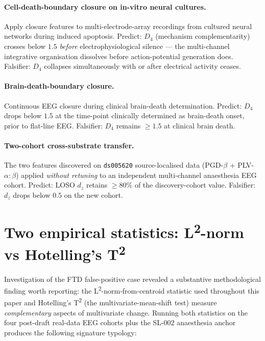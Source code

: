 \documentclass[11pt,a4paper]{article}
\begin{document}
\paragraph{Cell-death-boundary closure on in-vitro neural cultures.}
Apply closure features to multi-electrode-array recordings from cultured neural networks during induced apoptosis. Predict: $D_4$ (mechanism complementarity) crosses below $1.5$ \emph{before} electrophysiological silence --- the multi-channel integrative organisation dissolves before action-potential generation does. Falsifier: $D_4$ collapses simultaneously with or after electrical activity ceases.

\paragraph{Brain-death-boundary closure.}
Continuous EEG closure during clinical brain-death determination. Predict: $D_4$ drops below $1.5$ at the time-point clinically determined as brain-death onset, prior to flat-line EEG. Falsifier: $D_4$ remains $\geq 1.5$ at clinical brain death.

\paragraph{Two-cohort cross-substrate transfer.}
The two features discovered on \texttt{ds005620} source-localised data (PGD-$\beta$ + PLV-$\alpha{:}\beta$) applied \emph{without retuning} to an independent multi-channel anaesthesia EEG cohort. Predict: LOSO $d_z$ retains $\geq 80\%$ of the discovery-cohort value. Falsifier: $d_z$ drops below $0.5$ on the new cohort.

\section{Two empirical statistics: L\textsuperscript{2}-norm vs Hotelling's T\textsuperscript{2}}\label{sec:two-statistics}

Investigation of the FTD false-positive case revealed a substantive methodological finding worth reporting: the L\textsuperscript{2}-norm-from-centroid statistic used throughout this paper and Hotelling's T\textsuperscript{2} (the multivariate-mean-shift test) measure \emph{complementary} aspects of multivariate change. Running both statistics on the four post-draft real-data EEG cohorts plus the SL-002 anaesthesia anchor produces the following signature typology:
\end{document}
